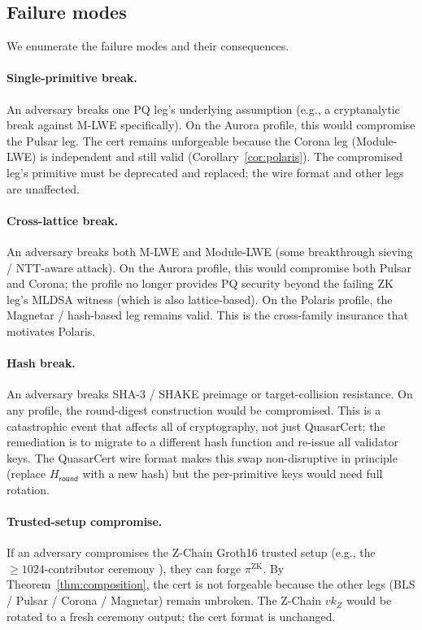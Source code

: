 \subsection{Failure modes}

We enumerate the failure modes and their consequences.

\paragraph{Single-primitive break.} An adversary breaks one PQ leg's
underlying assumption (e.g., a cryptanalytic break against M-LWE
specifically). On the Aurora profile, this would compromise the
Pulsar leg. The cert remains unforgeable because the Corona leg
(Module-LWE) is independent and still valid (Corollary~\ref{cor:polaris}).
The compromised leg's primitive must be deprecated and replaced;
the wire format and other legs are unaffected.

\paragraph{Cross-lattice break.} An adversary breaks both M-LWE and
Module-LWE (some breakthrough sieving / NTT-aware attack). On the
Aurora profile, this would compromise both Pulsar and Corona; the
profile no longer provides PQ security beyond the failing
$\mathrm{ZK}$ leg's MLDSA witness (which is also lattice-based).
On the Polaris profile, the Magnetar / hash-based leg remains
valid. This is the cross-family insurance that motivates Polaris.

\paragraph{Hash break.} An adversary breaks SHA-3 / SHAKE preimage
or target-collision resistance. On any profile, the round-digest
construction would be compromised. This is a catastrophic event
that affects all of cryptography, not just QuasarCert; the
remediation is to migrate to a different hash function and re-issue
all validator keys. The QuasarCert wire format makes this swap
non-disruptive in principle (replace $H_{\mathsf{round}}$ with a
new hash) but the per-primitive keys would need full rotation.

\paragraph{Trusted-setup compromise.} If an adversary compromises
the Z-Chain Groth16 trusted setup (e.g., the $\geq 1024$-contributor
ceremony \cite{bowegabizonmiers}), they can forge
$\pi^{\mathrm{ZK}}$. By Theorem~\ref{thm:composition}, the cert is
not forgeable because the other legs (BLS / Pulsar / Corona /
Magnetar) remain unbroken. The Z-Chain $\mathit{vk}_Z$ would be
rotated to a fresh ceremony output; the cert format is unchanged.

